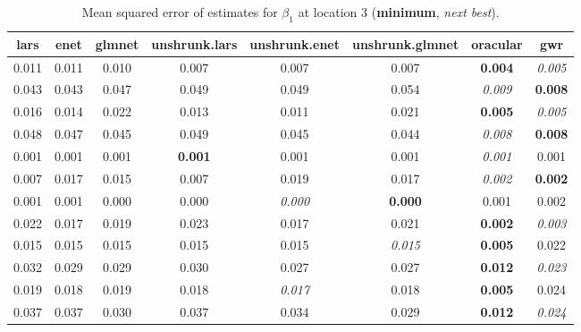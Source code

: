 \documentclass[authoryear, review, 11pt]{elsarticle}
\begin{document}
		\begin{table}[ht]
		\begin{center}
		\begin{tabular}{cccccccc}
		 lars & enet & glmnet & unshrunk.lars & unshrunk.enet & unshrunk.glmnet & oracular & gwr \\ 
		  \hline
		0.011 & 0.011 & 0.010 & 0.007 & 0.007 & 0.007 & \textbf{0.004} & \emph{0.005} \\ 
		  0.043 & 0.043 & 0.047 & 0.049 & 0.049 & 0.054 & \emph{0.009} & \textbf{0.008} \\ 
		  0.016 & 0.014 & 0.022 & 0.013 & 0.011 & 0.021 & \textbf{0.005} & \emph{0.005} \\ 
		  0.048 & 0.047 & 0.045 & 0.049 & 0.045 & 0.044 & \emph{0.008} & \textbf{0.008} \\ 
		  0.001 & 0.001 & 0.001 & \textbf{0.001} & 0.001 & 0.001 & \emph{0.001} & 0.001 \\ 
		  0.007 & 0.017 & 0.015 & 0.007 & 0.019 & 0.017 & \emph{0.002} & \textbf{0.002} \\ 
		  0.001 & 0.001 & 0.000 & 0.000 & \emph{0.000} & \textbf{0.000} & 0.001 & 0.002 \\ 
		  0.022 & 0.017 & 0.019 & 0.023 & 0.017 & 0.021 & \textbf{0.002} & \emph{0.003} \\ 
		  0.015 & 0.015 & 0.015 & 0.015 & 0.015 & \emph{0.015} & \textbf{0.005} & 0.022 \\ 
		  0.032 & 0.029 & 0.029 & 0.030 & 0.027 & 0.027 & \textbf{0.012} & \emph{0.023} \\ 
		  0.019 & 0.018 & 0.019 & 0.018 & \emph{0.017} & 0.018 & \textbf{0.005} & 0.024 \\ 
		  0.037 & 0.037 & 0.030 & 0.037 & 0.034 & 0.029 & \textbf{0.012} & \emph{0.024} \\ 
		  \end{tabular}
		\caption{Mean squared error of estimates for $\beta_1$ at location 3 (\textbf{minimum}, \emph{next best}).\label{loc3-X1-MSEX}}
		\end{center}
		\end{table}
		
\end{document}
